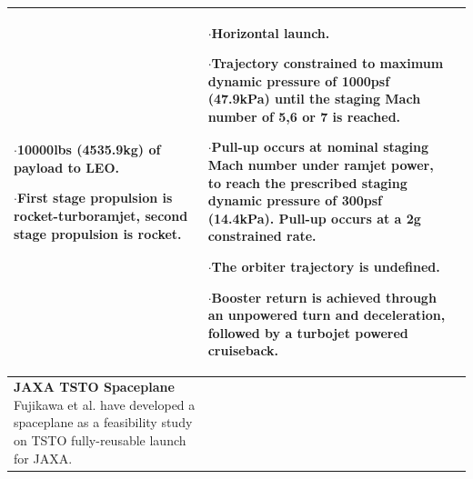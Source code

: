 {\begin{landscape}
\begin{xltabular}{\linewidth}{|X|X|X|}
	$\cdot$10000lbs (4535.9kg) of payload to LEO. 
	
	$\cdot$First stage propulsion is rocket-turboramjet, second stage propulsion is rocket. 
	
	
	&\small
	
	$\cdot$Horizontal launch.
	
	$\cdot$Trajectory constrained to maximum dynamic pressure of 1000psf (47.9kPa) until the staging Mach number of 5,6 or 7 is reached. 
	
	$\cdot$Pull-up occurs at nominal staging Mach number under ramjet power, to reach the prescribed staging dynamic pressure of 300psf (14.4kPa). Pull-up occurs at a 2g constrained rate. 
	
	$\cdot$The orbiter trajectory is undefined.
	
	$\cdot$Booster return is achieved through an unpowered turn and deceleration, followed by a turbojet powered cruiseback. 
	\\
	
	
	\hline \small 
	\textbf{JAXA TSTO Spaceplane}\cite{Fujikawa2017}\newline\newline
	Fujikawa et al.\cite{Fujikawa2017} have developed a spaceplane as a feasibility study on TSTO fully-reusable launch for JAXA. 
	

\end{xltabular}
\end{landscape}}
